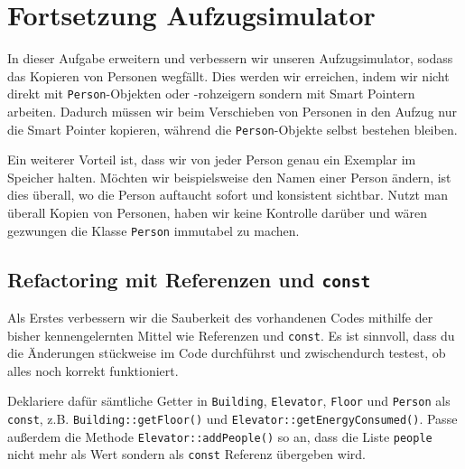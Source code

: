 \section{Fortsetzung Aufzugsimulator}
In dieser Aufgabe erweitern und verbessern wir unseren Aufzugsimulator, sodass das Kopieren von Personen wegfällt.
Dies werden wir erreichen, indem wir nicht direkt mit \texttt{Person}-Objekten oder -rohzeigern sondern mit Smart Pointern arbeiten.
Dadurch müssen wir beim Verschieben von Personen in den Aufzug nur die Smart Pointer kopieren, während die \texttt{Person}-Objekte selbst bestehen bleiben.

Ein weiterer Vorteil ist, dass wir von jeder Person genau ein Exemplar im Speicher halten.
Möchten wir beispielsweise den Namen einer Person ändern, ist dies überall, wo die Person auftaucht sofort und konsistent sichtbar.
Nutzt man überall Kopien von Personen, haben wir keine Kontrolle darüber und wären gezwungen die Klasse \texttt{Person} immutabel zu machen.


\subsection{Refactoring mit Referenzen und \texttt{const}}
Als Erstes verbessern wir die Sauberkeit des vorhandenen Codes mithilfe der bisher kennengelernten Mittel wie Referenzen und \texttt{const}.
Es ist sinnvoll, dass du die Änderungen stückweise im Code durchführst und zwischendurch testest, ob alles noch korrekt funktioniert.

Deklariere dafür sämtliche Getter in \texttt{Building}, \texttt{Elevator}, \texttt{Floor} und \texttt{Person} als \texttt{const}, z.B. \texttt{Building::getFloor()} und \texttt{Elevator::getEnergyConsumed()}.
Passe außerdem die Methode \texttt{Elevator::addPeople()} so an, dass die Liste \texttt{people} nicht mehr als Wert sondern als \texttt{const} Referenz übergeben wird.


